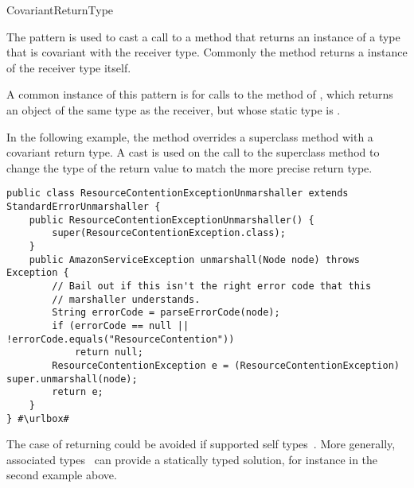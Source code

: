 \begin{pattern}{CovariantReturnType}

The \thisp{} pattern is used to cast a call to a method that returns
an instance of a type that is covariant with the 
receiver type.
Commonly the method returns a instance of the receiver type itself.

\instances{}
A common instance of this pattern is for calls to the 
 method of , which returns an object of the same type as the
receiver, but whose static type is .


In the following example,
the  method overrides a superclass method with a covariant return type.
A cast is used on the call to the superclass method 
to change the type of the return value to match the more precise return type.

\def\urlvar{http://bit.ly/aws_amplify_aws_sdk_android_2FVWl13}
\begin{verbatim}
public class ResourceContentionExceptionUnmarshaller extends StandardErrorUnmarshaller {
    public ResourceContentionExceptionUnmarshaller() {
        super(ResourceContentionException.class);
    }
    public AmazonServiceException unmarshall(Node node) throws Exception {
        // Bail out if this isn't the right error code that this
        // marshaller understands.
        String errorCode = parseErrorCode(node);
        if (errorCode == null || !errorCode.equals("ResourceContention"))
            return null;
        ResourceContentionException e = (ResourceContentionException) super.unmarshall(node);
        return e;
    }
} #\urlbox#
\end{verbatim}

\discussion{}
  The case of returning  
                 could be avoided if \java{} supported self types~\cite{bruceChallengingTypingIssues2003}.
  More generally, associated types~\cite{chakravartyAssociatedTypeSynonyms2005}
  can provide a statically typed solution, for instance in the second example
  above.

\end{pattern}


